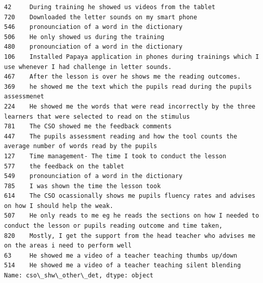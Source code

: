 \documentclass[11pt]{article}
\begin{document}
    \begin{Verbatim}[commandchars=\\\{\}]
42     During training he showed us videos from the tablet                                                                         
720    Downloaded the letter sounds on my smart phone                                                                              
546    pronounciation of a word in the dictionary                                                                                  
506    He only showed us during the training                                                                                       
480    pronounciation of a word in the dictionary                                                                                  
106    Installed Papaya application in phones during trainings which I use whenever I had challenge in letter sounds.              
467    After the lesson is over he shows me the reading outcomes.                                                                  
369    he showed me the text which the pupils read during the pupils assessmenet                                                   
224    He showed me the words that were read incorrectly by the three learners that were selected to read on the stimulus          
781    The CSO showed me the feedback comments                                                                                     
447    The pupils assessment reading and how the tool counts the average number of words read by the pupils                        
127    Time management- The time I took to conduct the lesson                                                                      
577    the feedback on the tablet                                                                                                  
549    pronounciation of a word in the dictionary                                                                                  
785    I was shown the time the lesson took                                                                                        
614    The CSO ocassionally shows me pupils fluency rates and advises on how I should help the weak.                               
507    He only reads to me eg he reads the sections on how I needed to conduct the lesson or pupils reading outcome and time taken,
820    Mostly, I get the support from the head teacher who advises me on the areas i need to perform well                          
63     He showed me a video of a teacher teaching thumbs up/down                                                                   
514    He showed me a video of a teacher teaching silent blending                                                                  
Name: cso\_shw\_other\_det, dtype: object

    \end{Verbatim}
\end{document}
